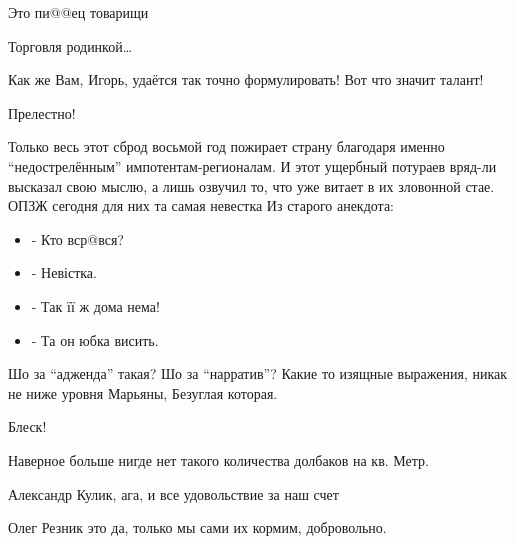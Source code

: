  
 
 
 
 
\begin{itemize}


Это пи@@ец товарищи


Торговля родинкой…


Как же Вам, Игорь, удаётся так точно формулировать! Вот что значит талант!


Прелестно!

Только весь этот сброд восьмой год пожирает страну благодаря именно
\enquote{недострелённым} импотентам-регионалам. И этот ущербный потураев
вряд-ли высказал свою мыслю, а лишь озвучил то, что уже витает в их зловонной
стае. ОПЗЖ сегодня для них та самая невестка Из старого анекдота:

\begin{itemize}
  \item - Кто вср@вся?
  \item - Невістка.
  \item - Так її ж дома нема!
  \item - Та он юбка висить.
\end{itemize}


Шо за \enquote{адженда} такая? Шо за \enquote{нарратив}?
Какие то изящные выражения, никак не ниже уровня Марьяны, Безуглая которая.


Блеск!


Наверное больше нигде нет такого количества долбаков на кв. Метр.

\begin{itemize}
Александр Кулик, ага, и все удовольствие за наш счет

Олег Резник это да, только мы сами их кормим, добровольно.


\end{itemize}
\end{itemize}
